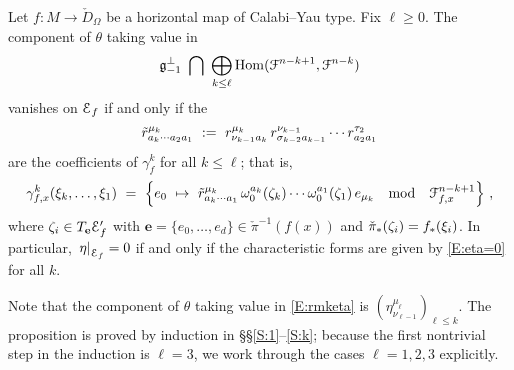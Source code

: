 \documentclass[12pt]{amsart}
\numberwithin{equation}{section}
\numberwithin{table}{section}
\numberwithin{figure}{section}
\begin{document}
\begin{proposition} \label{P:eta=0}
Let $f : M \to \check D_\Omega$ be a horizontal map of Calabi--Yau type.  Fix $\ell \ge 0$.  The component of $\theta$ taking value in 
\begin{equation}\label{E:rmketa}
  \fg^\perp_{-1} \ \bigcap \ 
  \bigoplus_{k\le\ell} \tHom(\cF^{n-k+1},\cF^{n-k})
\end{equation}
vanishes on $\mathcal E_f$ if and only if the 
\[
  \tilde r^{\mu_{k}}_{a_k\cdots a_2 a_1} \ := \ r^{\mu_{k}}_{\nu_{k-1} a_k} \, 
  r^{\nu_{k-1}}_{\s_{k-2} a_{k-1}} \cdots r^{\tau_2}_{a_2 a_1}
\]
are the coefficients of $\gamma^k_f$ for all $k \le \ell$; that is,
\begin{equation} \label{E:eta=0}
  \gamma^{k}_{f,x}(\xi_k,\ldots,\xi_1) \ = \ 
  \left\{ e_0 \ \mapsto \ 
  \tilde r^{\m_{k}}_{a_k\cdots a_1} \,\w^{a_k}_0(\z_k) \cdots \w^{a_1}_0(\z_1) 
  \, e_{\m_{k}} 
  \quad\hbox{mod}\quad \cF_{f,x}^{n-k+1} \right\} \,,
\end{equation}
where $\zeta_i \in T_\mathbf{e} \mathcal E'_f$ with $\mathbf{e} = \{ e_0 , \ldots , e_d\} \in \check\pi^{-1}(f(x))$ and $\check\pi_*(\zeta_i) = f_*(\xi_i)$.  In particular, $\left.\eta\right|_{\mathcal E_f} = 0$ if and only if the characteristic forms are given by \eqref{E:eta=0} for all $k$.
\end{proposition}

\noindent Note that the component of $\theta$ taking value in \eqref{E:rmketa} is $(\eta^{\mu_\ell}_{\nu_{\ell-1}})_{\ell\le k}$.  The proposition is proved by induction in \S\S\ref{S:1}--\ref{S:k}; because the first nontrivial step in the induction is $\ell=3$, we work through the cases $\ell=1,2,3$ explicitly.
\end{document}
